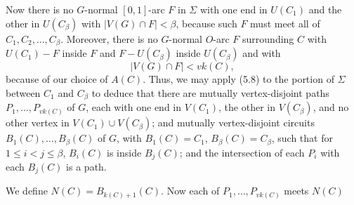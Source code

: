 Now there is no $G$-normal $[0, 1]$-arc $F$ in $\Sigma$ with one end in $U(C_1)$ and the other in $U(C_\beta)$ with $|V(G) \cap F| < \beta$, because such $F$ must meet all of $C_1, C_2, \dots, C_\beta$. Moreover, there is no $G$-normal $O$-arc $F$ surrounding $C$ with $U(C_1) - F$ inside $F$ and $F - U(C_\beta)$ inside $U(C_\beta)$ and with
\begin{equation*}
|V(G) \cap F| < vk(C),
\end{equation*}
because of our choice of $A(C)$. Thus, we may apply (5.8) to the portion of $\Sigma$ between $C_1$ and $C_\beta$ to deduce that there are mutually vertex-disjoint paths $P_1, \dots, P_{vk(C)}$ of $G$, each with one end in $V(C_1)$, the other in $V(C_\beta)$, and no other vertex in $V(C_1) \cup V(C_\beta)$; and mutually vertex-disjoint circuits $B_1(C), \dots, B_\beta(C)$ of $G$, with $B_1(C) = C_1$, $B_\beta(C) = C_\beta$, such that for $1 \le i < j \le \beta$, $B_i(C)$ is inside $B_j(C)$; and the intersection of each $P_i$ with each $B_j(C)$ is a path.

We define $N(C) = B_{k(C) + 1}(C)$. Now each of $P_1, \dots, P_{vk(C)}$ meets $N(C)$

